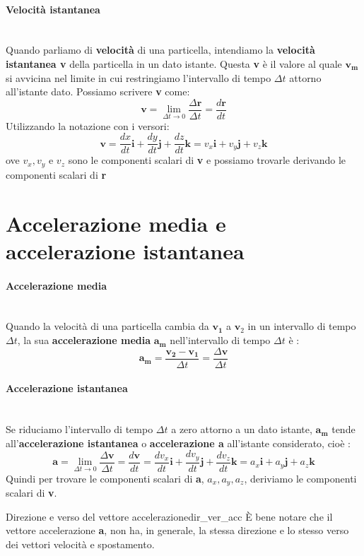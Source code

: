 \documentclass[12pt]{report}
\newcommand{\nmu}{}
\begin{document}
	\paragraph{Velocità istantanea}\quad \\ Quando parliamo di \textbf{velocità} di una particella, intendiamo la \textbf{velocità istantanea v} della particella in un dato istante. Questa \textbf{v} è  il valore al quale $\mathbf{v_m}$ si avvicina nel limite in cui restringiamo l'intervallo di tempo $\Delta t$ attorno all'istante dato. Possiamo scrivere \textbf{v} come:
	\[
	\textbf{v} = \lim_{\Delta t \to 0}\frac{\Delta \textbf{r}}{\Delta t} = \frac{d\textbf{r}}{dt}
	\]
	Utilizzando la notazione con i versori:
	\[
	\textbf{v} = \frac{dx}{dt}\textbf{i} + \frac{dy}{dt}\textbf{j}+\frac{dz}{dt}\textbf{k} = v_x\textbf{i}+v_y\textbf{j}+v_z\textbf{k}
	\]
	ove $v_x, v_y$ e $v_z$ sono le componenti scalari di \textbf{v} e possiamo trovarle derivando le componenti scalari di \textbf{r}
	\section{Accelerazione media e accelerazione istantanea}
	\paragraph{Accelerazione media} \quad \\
	Quando la velocità di una particella cambia da $\mathbf{v_1}$ a $\mathbf{v}_2$ in un intervallo di tempo $\Delta t$, la sua \textbf{accelerazione media} $\mathbf{a_m}$ nell'intervallo di tempo $\Delta t$ è :
	\[
	\mathbf{a_m} = \frac{\mathbf{v_2} - \mathbf{v_1}}{\Delta t} = \frac{\Delta \textbf{v}}{\Delta t}
	\]
	\paragraph{Accelerazione istantanea} \quad \\
	Se riduciamo l'intervallo di tempo $\Delta t$ a zero attorno a un dato istante, $\mathbf{a_m}$ tende all'\textbf{accelerazione istantanea} o \textbf{accelerazione a} all'istante considerato, cioè :
	\[
	\textbf{a} = \lim_{\Delta t\to 0}\frac{\Delta \textbf{v}}{\Delta t}=\frac{d\textbf{v}}{dt} = \frac{dv_x}{dt}\textbf{i} + \frac{dv_y}{dt}\textbf{j} + \frac{dv_z}{dt}\textbf{k} = a_x\textbf{i} + a_y\textbf{j} + a_z\textbf{k}
	\]
	Quindi per trovare le componenti scalari di \textbf{a}, $a_x, a_y, a_z$, deriviamo le componenti scalari di \textbf{v}.
	\begin{note}{\nmu Direzione e verso del vettore accelerazione}{dir_ver_acc}
		È  bene notare che il vettore accelerazione \textbf{a}, non ha, in generale, la stessa direzione e lo stesso verso dei vettori velocità e spostamento.
	\end{note}
\end{document}
